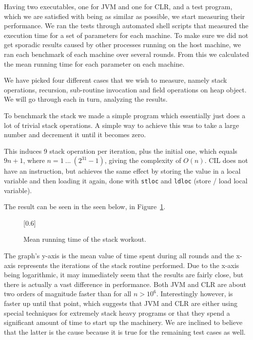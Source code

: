 Having two executables, one for JVM and one for CLR, and a \thename{} test
program, which we are satisfied with being as similar as possible, we start
measuring their performance. We ran the tests through automated shell scripts
that measured the execution time for a set of parameters for each machine. To
make sure we did not get sporadic results caused by other processes running on
the host machine, we ran each benchmark of each machine over several
rounds. From this we calculated the mean running time for each parameter on each
machine.

We have picked four different cases that we wish to measure, namely stack
operations, recursion, sub-routine invocation and field operations on heap
object. We will go through each in turn, analyzing the results.


To benchmark the stack we made a simple program which essentially just does a
lot of trivial stack operations. A simple way to achieve this was to take a
large number and decrement it until it becomes zero.

\begin{stackops}
\end{stackops}

This induces 9 stack operation per iteration, plus the initial one, which
equals $9n + 1$, where $n = 1\ ...\ (2^{31} -1)$, giving the complexity of
$O(n)$. CIL does not have an  instruction, but achieves the
same effect by storing the value in a local variable and then loading it again,
done with {\tt stloc} and {\tt ldloc} (store / load local variable).

The result can be seen in the seen below, in
Figure~\ref{fig:eval:benchmark:stack}.
\begin{figure}[H]
  \centering
  \scalebox{0.8}[0.6]{}
  \caption{Mean running time of the stack workout.}
\label{fig:eval:benchmark:stack}
\end{figure}

The graph's y-axis is the mean value of time spent during all rounds and the
x-axis represents the iterations of the stack routine performed. Due to the
x-axis being logarithmic, it may immediately seem that the results are fairly
close, but there is actually a vast difference in performance. Both JVM and CLR
are about two orders of magnitude faster than \thename{} for all
$n>10^6$. Interestingly however, \thename{} is faster up until that point, which
suggests that JVM and CLR are either using special techniques for extremely
stack heavy programs or that they spend a significant amount of time to start up
the machinery. We are inclined to believe that the latter is the cause because
it is true for the remaining test cases as well.

